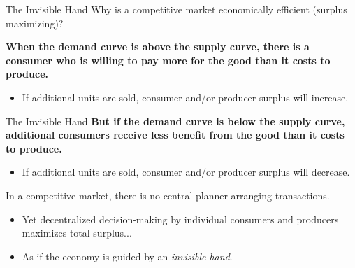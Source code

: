 \documentclass[11pt,t]{beamer}
\begin{document}
\begin{frame}{The Invisible Hand}
  Why is a competitive market economically efficient (surplus maximizing)?

  \bigskip
  \textbf{When the demand curve is above the supply curve, there is a consumer who is willing to pay more for the good than it costs to produce.}

  \begin{itemize}
    \item If additional units are sold, consumer and/or producer surplus will increase.
  \end{itemize}
\end{frame}

\begin{frame}{The Invisible Hand}
  \textbf{But if the demand curve is below the supply curve, additional consumers receive less benefit from the good than it costs to produce.}

  \begin{itemize}
    \item If additional units are sold, consumer and/or producer surplus will decrease.
  \end{itemize}

  \pause\bigskip
  In a competitive market, there is no central planner arranging transactions.

  \begin{itemize}
    \item Yet decentralized decision-making by individual consumers and producers maximizes total surplus...
    
    \item As if the economy is guided by an \textit{invisible hand}.
  \end{itemize}  
\end{frame}
\end{document}
